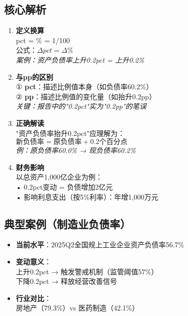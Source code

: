 \subsection{核心解析}
\begin{enumerate}[leftmargin=*, nosep]
    \item \textbf{定义换算}  \\
    pct = \% = 1/100 \\
    公式：$ \Delta pct = \Delta \% $ \\
    \textit{案例：资产负债率上升0.2pct = 上升0.2\%}
    
    \item \textbf{与pp的区别}  \\
    ① \textbf{pct}：描述比例值本身（如负债率60.2\%） \\
    ② \textbf{pp}：描述比例值的变化量（如抬升0.2pp） \\
    \textit{关键：报告中的"0.2pct"实为"0.2pp"的笔误}
    
    \item \textbf{正确解读}  \\
    "资产负债率抬升0.2pct"应理解为： \\
    $ \text{新负债率} = \text{原负债率} + 0.2\text{个百分点} $ \\
    \textit{例：原负债率60.0\% → 现负债率60.2\%}
    
    \item \textbf{财务影响}  \\
    以总资产1,000亿企业为例： \\
    • 0.2pct变动 = 负债增加2亿元 \\
    • 影响利息支出（按5\%利率）：年增1,000万元
\end{enumerate}

\subsection{典型案例（制造业负债率）}
\begin{itemize}[leftmargin=*, nosep]
    \item \textbf{当前水平}：2025Q2全国规上工业企业资产负债率56.7\%
    
    \item \textbf{变动意义}：\\
    上升0.2pct → 触发警戒机制（监管阈值57\%）\\
    下降0.2pct → 释放经营改善信号
    
    \item \textbf{行业对比}：\\
    房地产（79.3\%）vs 医药制造（42.1\%）
\end{itemize}


